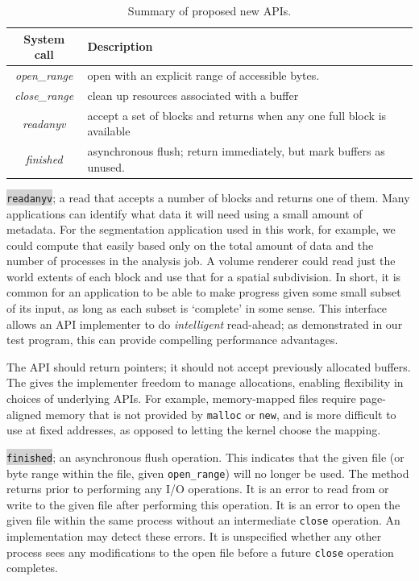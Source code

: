 \begin{table}
  \centering
  \begin{tabular}{|c|l|}\hline
    \textbf{System call} & \textbf{Description}\\\hline
    \textit{open\_range} & open with an explicit range of accessible bytes.\\
    \textit{close\_range} & clean up resources associated with a
      buffer \\
    \textit{readanyv} & accept a set of blocks and returns when any one
      full block is available\\
    \textit{finished} & asynchronous flush; return immediately, but mark
      buffers as unused.\\\hline
  \end{tabular}
  \caption{Summary of proposed new APIs.}
  \label{tbl:api}
\end{table}

\colorbox{lightgray}{\texttt{readanyv}}; a read that accepts a number
of blocks and returns one of them.  Many applications can identify
what data it will need using a small amount of metadata.  For the
segmentation application used in this work, for example, we could
compute that easily based only on the total amount of data and the
number of processes in the analysis job.  A volume renderer could
read just the world extents of each block and use that for a spatial
subdivision.  In short, it is common for an application to be able to
make progress given some small subset of its input, as long as each
subset is `complete' in some sense.  This interface allows an API
implementer to do \emph{intelligent} read-ahead; as demonstrated in our
test program, this can provide compelling performance advantages.

The API should return pointers; it should not accept previously
allocated buffers.  The gives the implementer freedom to manage
allocations, enabling flexibility in choices of underlying APIs.  For
example, memory-mapped files require page-aligned memory that is not
provided by \verb!malloc! or \verb!new!, and is more difficult to
use at fixed addresses, as opposed to letting the kernel choose the
mapping.

\colorbox{lightgray}{\texttt{finished}}; an asynchronous flush
operation.  This indicates that the given file (or byte range within
the file, given \texttt{open\_range}) will no longer be used.  The
method returns prior to performing any I/O operations.  It is an
error to read from or write to the given file after performing
this operation.  It is an error to open the given file within the
same process without an intermediate \verb!close! operation.  An
implementation may detect these errors.  It is unspecified whether any
other process sees any modifications to the open file before a future
\verb!close! operation completes.

